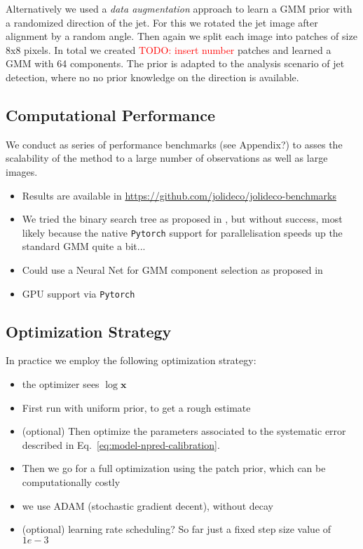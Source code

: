 \documentclass[twocolumn]{aastex631}
\newcommand{\todo}[1]{\textcolor{red}{TODO: #1}\PackageWarning{TODO:}{#1!}}
\begin{document}
    Alternatively we used a \textit{data augmentation} approach to learn a GMM prior with a randomized direction of the jet. For this we rotated the jet image after alignment by 
    a random angle. Then again we split each image into patches of size 8x8 pixels. In total we created \todo{insert number} patches and learned a GMM with 64 components. The prior
    is adapted to the analysis scenario of jet detection, where no no prior knowledge on the
    direction is available.

    \subsection{Computational Performance}
    We conduct as series of performance benchmarks (see Appendix?) to asses the scalability of the method to a large number of observations
    as well as large images. 

    \begin{itemize}
        \item Results are available in \url{https://github.com/jolideco/jolideco-benchmarks}
        \item We tried the binary search tree as proposed in \cite{Parameswaran2018},
        but without success, most likely because the native \texttt{Pytorch} support
        for parallelisation speeds up the standard GMM quite a bit...
        \item Could use a Neural Net for GMM component selection as proposed in \cite{Rosenbaum15}
        \item GPU support via \texttt{Pytorch}

    \end{itemize}

    \subsection{Optimization Strategy}
    In practice we employ the following optimization strategy:
    \begin{itemize}
        \item the optimizer sees $\log{\mathbf{x}}$
        \item First run with uniform prior, to get a rough estimate
        \item (optional) Then optimize the parameters associated to the systematic error described in Eq.~\ref{eq:model-npred-calibration}.
        \item Then we go for a full optimization using the patch prior, which can be computationally costly
        \item we use ADAM (stochastic gradient decent), without decay
        \item  (optional) learning rate scheduling? So far just a fixed step size value of $1e-3$
    \end{itemize}
    
\end{document}
